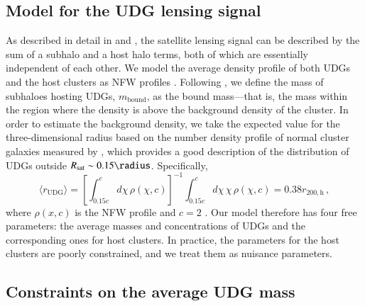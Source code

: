 \documentclass[usenatbib,fleqn]{mnras}
\begin{document}
\subsection{Model for the UDG lensing signal}

As described in detail in \cite{yang06} and \cite{sifon15_kids}, the satellite lensing signal can be described by the sum of a subhalo and a host halo terms, both of which are essentially independent of each other. We model the average density profile of both UDGs and the host clusters as NFW profiles \citep{nfw95}.
%
Following \cite{sifon16_satellites}, we define the mass of subhaloes hosting UDGs, $m_\mathrm{bound}$, as the bound mass---that is, the mass within the region where the density is above the background density of the cluster. In order to estimate the background density, we take the expected value for the three-dimensional radius based on the number density profile of normal cluster galaxies measured by \cite{vdburg15}, which provides a good description of the distribution of UDGs outside $R_\mathrm{sat}\sim0.15\radius$. Specifically,
\begin{equation}
 \langle r_\mathrm{UDG} \rangle = 
  \left[\int_{0.15c}^c d\chi\,\rho(\chi, c)\right]^{-1}
    \int_{0.15c}^c d\chi\,\chi\,\rho(\chi, c) = 0.38r_\mathrm{200,h}\,,
\end{equation}
where $\rho(x, c)$ is the NFW profile and $c=2$ \citep{vdburg15,vdburg16}.
Our model therefore has four free parameters: the average masses and concentrations of UDGs and the corresponding ones for host clusters. In practice, the parameters for the host clusters are poorly constrained, and we treat them as nuisance parameters.


\subsection{Constraints on the average UDG mass}
\end{document}
